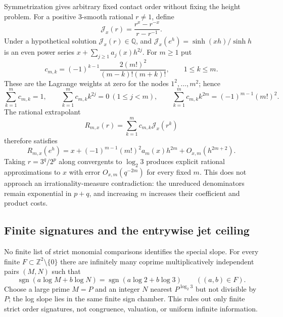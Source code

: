 \documentclass[11pt,oneside]{article}
\theoremstyle{definition}
\theoremstyle{remark}
\newcommand{\Z}{\mathbb Z}
\newcommand{\Q}{\mathbb Q}
\begin{document}
Symmetrization gives arbitrary fixed contact order without fixing the height problem.  For a
positive $3$-smooth rational $r\ne1$, define
\begin{equation}
 \mathcal J_x(r)=\frac{r^x-r^{-x}}{r-r^{-1}}.
 \label{gapjet:eq-symmetric-secant}
\end{equation}
Under a hypothetical solution $\mathcal J_x(r)\in\Q$, and
$\mathcal J_x(e^h)=\sinh(xh)/\sinh h$ is an even power series
$x+\sum_{j\ge1}a_j(x)h^{2j}$.  For $m\ge1$ put
\begin{equation}
 c_{m,k}=(-1)^{k-1}\frac{2(m!)^2}{(m-k)!(m+k)!},\qquad1\le k\le m.
 \label{gapjet:eq-richardson-coefficients}
\end{equation}
These are the Lagrange weights at zero for the nodes $1^2,\ldots,m^2$; hence
\begin{equation}
 \sum_{k=1}^mc_{m,k}=1,\qquad
 \sum_{k=1}^mc_{m,k}k^{2j}=0\ (1\le j<m),\qquad
 \sum_{k=1}^mc_{m,k}k^{2m}=(-1)^{m-1}(m!)^2.
 \label{gapjet:eq-richardson-moments}
\end{equation}
The rational extrapolant
\begin{equation}
 R_{m,x}(r)=\sum_{k=1}^mc_{m,k}\mathcal J_x(r^k)
 \label{gapjet:eq-richardson-extrapolant}
\end{equation}
therefore satisfies
\begin{equation}
 R_{m,x}(e^h)=x+(-1)^{m-1}(m!)^2a_m(x)h^{2m}
 +O_{x,m}(h^{2m+2}).
 \label{gapjet:eq-richardson-contact}
\end{equation}
Taking $r=3^q/2^p$ along convergents to $\log_2 3$ produces explicit rational
approximations to $x$ with error $O_{x,m}(q^{-2m})$ for every fixed $m$.  This does not
approach an irrationality-measure contradiction: the unreduced denominators remain
exponential in $p+q$, and increasing $m$ increases their coefficient and product costs.

\subsection{Finite signatures and the entrywise jet ceiling}
\label{gapjet:finite-barriers}

No finite list of strict monomial comparisons identifies the special slope.  For every
finite $F\subset\Z^2\setminus\{0\}$ there are infinitely many coprime multiplicatively
independent pairs $(M,N)$ such that
\[
 \operatorname{sgn}(a\log M+b\log N)
 =\operatorname{sgn}(a\log2+b\log3)\qquad((a,b)\in F).
\]
Choose a large prime $M=P$ and an integer $N$ nearest $P^{\log_2 3}$ but not divisible by
$P$; the log slope lies in the same finite sign chamber.  This rules out only finite strict
order signatures, not congruence, valuation, or uniform infinite information.
\end{document}
